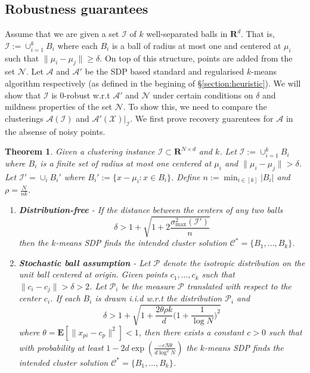 \documentclass[12pt]{article}
\newcommand{\mc}{\mathcal}
\newcommand{\mb}{\mathbf}
\newtheorem{theorem}{Theorem}
\begin{document}
\subsection{Robustness guarantees}
\label{subsection:sdpRobust}

Assume that we are given a set $\mc I$ of $k$ well-separated balls in $\mb R^d$. That is, $\mc I := \cup_{i=1}^k B_i$ where each $B_i$ is a ball of radius at most one and centered at $\mu_i$ such that $\|\mu_i - \mu_j\| \ge \delta$. On top of this structure, points are added from the set $\mc N$. Let $\mc A$ and $\mc A'$ be the SDP based standard and regularised $k$-means algorithm respectively (as defined in the begining of \S \ref{section:heuristic}). We will show that $\mc I$ is $0$-robust w.r.t $\mc A'$ and $\mc N$ under certain conditions on $\delta$ and mildness properties of the set $\mc N$. To show this, we need to compare the clusterings $\mc A(\mc I)$ and $\mc A'(\mc X)|_{\mc I}$. We first prove recovery guarentees for $\mc A$ in the absense of noisy points.

\begin{theorem}
\label{thm:SDPGeneral}
Given a clustering instance $\mc I \subset \mb R^{N\times d}$ and $k$. Let $\mc I := \cup_{i=1}^k B_i$ where $B_i$ is a finite set of radius at most one centered at $\mu_i$ and $\|\mu_i - \mu_j\| > \delta$. Let $\mc I' = \cup_i B_i'$ where $B_i' := \{x - \mu_i : x \in B_i\}$. Define $ n := \min_{i\in[k]} |B_i|$ and $\rho = \frac{N}{nk}$.
\begin{enumerate}[leftmargin=*,nolistsep,noitemsep]
	\item \textbf{Distribution-free} - If the distance between the centers of any two balls 
$$\delta > 1 + \sqrt{1+ 2\frac{\sigma_{\max}^2(\mc I')}{n}}$$ 
then the $k$-means SDP finds the intended cluster solution  $\mc C^* = \{B_1, \ldots, B_k\}$.
	\item \textbf{Stochastic ball assumption} - Let $\mc P$ denote the isotropic distribution on the unit ball centered at origin. Given points $c_1, \ldots, c_k$ such that $\|c_i - c_j\| > \delta  > 2$. Let $\mc P_i$ be the measure $\mc P$ translated with respect to the center $c_i$. If each $B_i$ is drawn i.i.d w.r.t the distribution $\mc P_i$ and 
$$\delta > 1 + \sqrt{1+\frac{2\theta\rho k}{d}\Big(1+\frac{1}{\log N}\Big)^2}$$  
where $\theta = \mb E[\|x_{pi}-c_p\|^2] < 1$, then there exists a constant $c > 0$ such that with probability at least $1 - 2d\exp(\frac{-cN\theta}{d\log^2N})$ the $k$-means SDP finds the intended cluster solution  $\mc C^* = \{B_1, \ldots, B_k\}$.
\end{enumerate}
\end{theorem}
\end{document}
